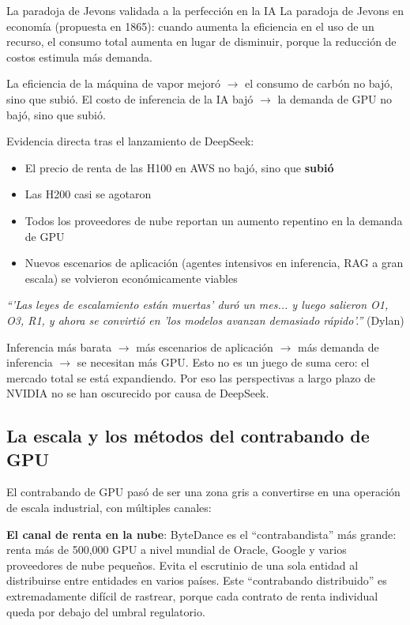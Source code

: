 \begin{importantbox}{La paradoja de Jevons validada a la perfección en la IA}
La paradoja de Jevons en economía (propuesta en 1865): cuando aumenta la eficiencia en el uso de un recurso, el consumo total aumenta en lugar de disminuir, porque la reducción de costos estimula más demanda.

La eficiencia de la máquina de vapor mejoró $\to$ el consumo de carbón no bajó, sino que subió. El costo de inferencia de la IA bajó $\to$ la demanda de GPU no bajó, sino que subió.

Evidencia directa tras el lanzamiento de DeepSeek:
\begin{itemize}
    \item El precio de renta de las H100 en AWS no bajó, sino que \textbf{subió}
    \item Las H200 casi se agotaron
    \item Todos los proveedores de nube reportan un aumento repentino en la demanda de GPU
    \item Nuevos escenarios de aplicación (agentes intensivos en inferencia, RAG a gran escala) se volvieron económicamente viables
\end{itemize}

\textit{``'Las leyes de escalamiento están muertas' duró un mes... y luego salieron O1, O3, R1, y ahora se convirtió en 'los modelos avanzan demasiado rápido'.''} (Dylan)

Inferencia más barata $\to$ más escenarios de aplicación $\to$ más demanda de inferencia $\to$ se necesitan más GPU. Esto no es un juego de suma cero: el mercado total se está expandiendo. Por eso las perspectivas a largo plazo de NVIDIA no se han oscurecido por causa de DeepSeek.
\end{importantbox}

\subsection{La escala y los métodos del contrabando de GPU}

El contrabando de GPU pasó de ser una zona gris a convertirse en una operación de escala industrial, con múltiples canales:

\textbf{El canal de renta en la nube}: ByteDance es el ``contrabandista'' más grande: renta más de 500,000 GPU a nivel mundial de Oracle, Google y varios proveedores de nube pequeños. Evita el escrutinio de una sola entidad al distribuirse entre entidades en varios países. Este ``contrabando distribuido'' es extremadamente difícil de rastrear, porque cada contrato de renta individual queda por debajo del umbral regulatorio.

